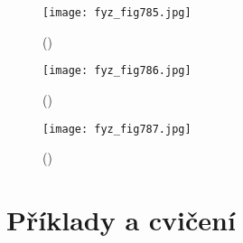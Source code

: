     \begin{figure}[ht!] %
      \centering
      \texttt{[image: fyz\_fig785.jpg]}
      \caption{
               (\cite[s.~707]{Feynman02})}
      \label{fyz:fig785}
    \end{figure}

    \begin{figure}[ht!] %
      \centering
      \texttt{[image: fyz\_fig786.jpg]}
      \caption{
               (\cite[s.~707]{Feynman02})}
      \label{fyz:fig786}
    \end{figure}

    \begin{figure}[ht!] %
      \centering
      \texttt{[image: fyz\_fig787.jpg]}
      \caption{
               (\cite[s.~707]{Feynman02})}
      \label{fyz:fig787}
    \end{figure}


  \section{Příklady a cvičení}\label{fyz:IIchapXXXsecX}


